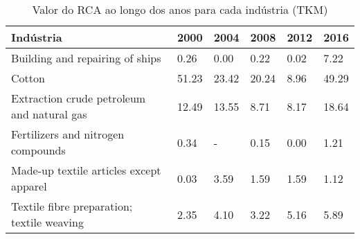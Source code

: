 \begin{table}
\centering
\caption{Valor do RCA ao longo dos anos para cada indústria (TKM)}
\label{tab:ex3-tempo-TKM}
\begin{tabular}{p{6cm}p{1.5cm}p{1.5cm}p{1.5cm}p{1.5cm}p{1.5cm}}
\toprule
                                 Indústria &  2000 &  2004 &  2008 & 2012 &  2016 \\
\midrule
           Building and repairing of ships &  0.26 &  0.00 &  0.22 & 0.02 &  7.22 \\
                                    Cotton & 51.23 & 23.42 & 20.24 & 8.96 & 49.29 \\
Extraction crude petroleum and natural gas & 12.49 & 13.55 &  8.71 & 8.17 & 18.64 \\
        Fertilizers and nitrogen compounds &  0.34 &     - &  0.15 & 0.00 &  1.21 \\
   Made-up textile articles except apparel &  0.03 &  3.59 &  1.59 & 1.59 &  1.12 \\
Textile fibre preparation; textile weaving &  2.35 &  4.10 &  3.22 & 5.16 &  5.89 \\
\bottomrule
\end{tabular}
\end{table}
